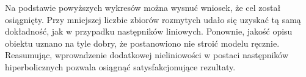 Na podstawie powyższych wykresów można wysnuć wniosek, że cel został osiągnięty. Przy mniejszej liczbie zbiorów rozmytych udało się uzyskać tą samą dokładność, jak w przypadku następników liniowych. Ponownie, jakość opisu obiektu uznano na tyle dobry, że postanowiono nie stroić modelu ręcznie. Reasumując, wprowadzenie dodatkowej nieliniowości w postaci następników hiperbolicznych pozwala osiągnąć satysfakcjonujące rezultaty.